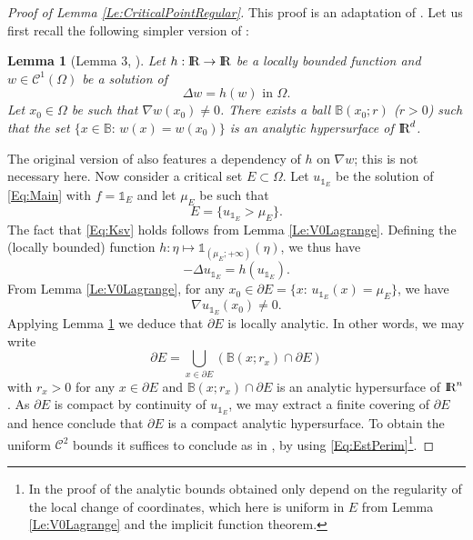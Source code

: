 \documentclass{article}
\newcommand{\R}{\textnormal{I\kern-0.21emR}}
\def\B{{\mathbb B}}
\newtheorem{lemma}[material]{Lemma}
\def\O{{\Omega}}
\def\n{{\nabla}}
\numberwithin{equation}{section}
\begin{document}
\begin{proof}[Proof of Lemma \ref{Le:CriticalPointRegular}] This proof is an adaptation of \cite[Proof of Theorem 8]{Chanillo_2000}. Let us first recall the following simpler version of \cite[Lemma 3]{Chanillo_2000}:
\begin{lemma}[Lemma 3, \cite{Chanillo_2000}]\label{Le:Chanillo}
Let $h:\R\to \R$ be a locally bounded function and $w\in \mathscr C^1(\O)$ be a solution of 
\[\Delta w=h(w)\text{ in }\O.\]Let $x_0\in \O$ be such that $\n w(x_0)\neq 0$. There exists a ball $\mathbb B(x_0;r)$ ($r>0$) such that the set $\{x\in \B:\, w(x)=w(x_0)\}$ is an analytic hypersurface of $\R^d$.
\end{lemma}
The original version of \cite[Lemma 3]{Chanillo_2000} also features a dependency of $h$ on $\n w$; this is not necessary here. Now consider a critical set $E\subset \O$. Let $u_{\mathds 1_E}$ be the solution of \eqref{Eq:Main} with $f=\mathds 1_E$ and let $\mu_E$ be such that 
\begin{equation}\label{Eq:Ksv}
E=\{u_{\mathds 1_E}>\mu_E\}.
\end{equation} The fact that \eqref{Eq:Ksv} holds follows from Lemma \ref{Le:V0Lagrange}.  Defining the (locally bounded) function $h:\eta\mapsto \mathds 1_{(\mu_E;+\infty)}(\eta)$, we thus have 
\[-\Delta u_{\mathds 1_E}=h(u_{\mathds 1_E}).\]
From Lemma \ref{Le:V0Lagrange}, for any $x_0\in \partial E=\{x:\, u_{\mathds 1_E}(x)=\mu_E\}$, we have 
\[ \n u_{\mathds 1_E}(x_0)\neq 0.\] Applying Lemma \ref{Le:Chanillo} we deduce that $\partial E$ is locally analytic.  In other words, we may write 
\[ \partial E=\underset{x\in \partial E}\bigcup (\B(x;r_x)\cap \partial E)\] with $r_x>0$ for any $x\in \partial E$ and $\B(x;r_x)\cap \partial E$ is an analytic hypersurface of $\R^n$. As $\partial E$ is compact by continuity of $u_{\mathds 1_E}$, we may extract a finite covering of $\partial E$ and hence conclude that $\partial E$ is a compact analytic hypersurface. To obtain the uniform $\mathscr C^2$ bounds it suffices to conclude as in \cite[Lemma 3, Theorem 8]{Chanillo_2000}, by using \eqref{Eq:EstPerim}\footnote{In the proof of \cite[Lemma 3]{Chanillo_2000} the analytic bounds obtained only depend on the regularity of the  local change of coordinates, which here is uniform in $E$ from Lemma \ref{Le:V0Lagrange} and the implicit function theorem.}.
\end{proof}
\end{document}
